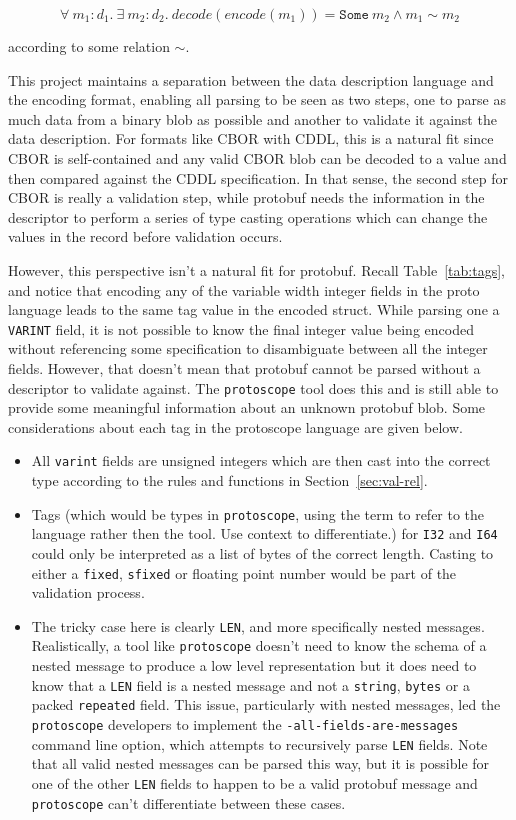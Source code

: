 \documentclass[11pt]{article}
\theoremstyle{definition}
\theoremstyle{plain}
\begin{document}
\[ \forall\ m_1:d_1.\ \exists\ m_2:d_2.\ decode(encode(m_1)) = \mathtt{Some}\ m_2 \wedge m_1 \sim m_2 \]

according to some relation $\sim$. 

This project maintains a separation between the data description language and
the encoding format, enabling all parsing to be seen as two steps, one to parse
as much data from a binary blob as possible and another to validate it against
the data description. For formats like CBOR with CDDL, this is a natural fit
since CBOR is self-contained and any valid CBOR blob can be decoded to a value
and then compared against the CDDL specification. In that sense, the second step
for CBOR is really a validation step, while protobuf needs the information in
the descriptor to perform a series of type casting operations which can change
the values in the record before validation occurs.

However, this perspective isn't a natural fit for protobuf. Recall
Table~\ref{tab:tags}, and notice that encoding any of the variable width integer
fields in the proto language leads to the same tag value in the encoded
struct. While parsing one a \texttt{VARINT} field, it is not possible to know
the final integer value being encoded without referencing some specification to
disambiguate between all the integer fields. However, that doesn't mean that
protobuf cannot be parsed without a descriptor to validate against. The
\texttt{protoscope} tool does this and is still able to provide some meaningful
information about an unknown protobuf blob. Some considerations about each tag
in the protoscope language are given below.

\begin{itemize}
\item All \texttt{varint} fields are unsigned integers which are then cast into
  the correct type according to the rules and functions in
  Section~\ref{sec:val-rel}.
\item Tags (which would be types in \texttt{protoscope}, using the term to refer
  to the language rather then the tool. Use context to differentiate.) for
  \texttt{I32} and \texttt{I64} could only be interpreted as a list of bytes of
  the correct length. Casting to either a \texttt{fixed}, \texttt{sfixed} or
  floating point number would be part of the validation process.
\item The tricky case here is clearly \texttt{LEN}, and more specifically nested
  messages. Realistically, a tool like \texttt{protoscope} doesn't need to know
  the schema of a nested message to produce a low level representation but it
  does need to know that a \texttt{LEN} field is a nested message and not a
  \texttt{string}, \texttt{bytes} or a packed \texttt{repeated} field. This
  issue, particularly with nested messages, led the \texttt{protoscope}
  developers to implement the \texttt{-all-fields-are-messages} command line
  option, which attempts to recursively parse \texttt{LEN} fields. Note that all
  valid nested messages can be parsed this way, but it is possible for one of
  the other \texttt{LEN} fields to happen to be a valid protobuf message and
  \texttt{protoscope} can't differentiate between these cases.
\end{itemize}
\end{document}
